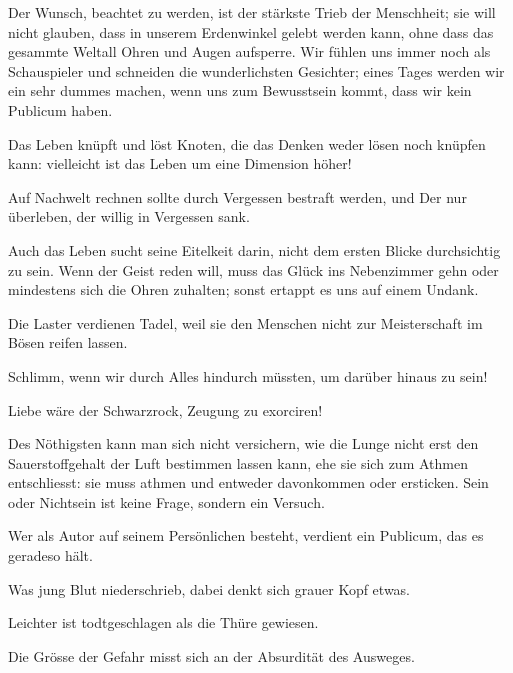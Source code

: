 Der Wunsch, beachtet zu werden, ist der stärkste Trieb der Menschheit; sie will nicht glauben, dass in unserem Erdenwinkel gelebt werden kann, ohne dass das gesammte Weltall Ohren und Augen aufsperre. Wir fühlen uns immer noch als Schauspieler und schneiden die wunderlichsten Gesichter; eines Tages werden wir ein sehr dummes machen, wenn uns zum Bewusstsein kommt, dass wir kein Publicum haben.
\par

Das Leben knüpft und löst Knoten, die das Denken weder lösen noch knüpfen kann: vielleicht ist das Leben um eine Dimension höher!
\par

Auf Nachwelt rechnen sollte durch Vergessen bestraft werden, und Der nur überleben, der willig in Vergessen sank.
\par

Auch das Leben sucht seine Eitelkeit darin, nicht dem ersten Blicke durchsichtig zu sein. Wenn der Geist reden will, muss das Glück ins Nebenzimmer gehn oder mindestens sich die Ohren zuhalten; sonst ertappt es uns auf einem Undank.
\par

Die Laster verdienen Tadel, weil sie den Menschen nicht zur Meisterschaft im Bösen reifen lassen.
\par

Schlimm, wenn wir durch Alles hindurch müssten, um darüber hinaus zu sein!
\par

Liebe wäre der Schwarzrock, Zeugung zu exorciren!
\par

Des Nöthigsten kann man sich nicht versichern, wie die Lunge nicht erst den Sauerstoffgehalt der Luft bestimmen lassen kann, ehe sie sich zum Athmen entschliesst: sie muss athmen und entweder davonkommen oder ersticken. Sein oder Nichtsein ist keine Frage, sondern ein Versuch.
\par

Wer als Autor auf seinem Persönlichen besteht, verdient ein Publicum, das es geradeso hält.
\par

Was jung Blut niederschrieb, dabei denkt sich grauer Kopf etwas.
\par

Leichter ist todtgeschlagen als die Thüre gewiesen.
\par

Die Grösse der Gefahr misst sich an der Absurdität des Ausweges.
\par

